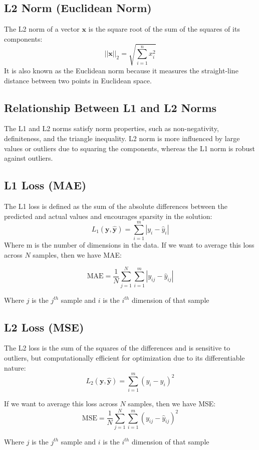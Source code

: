 \documentclass[12pt]{article}
\begin{document}
\subsection{L2 Norm (Euclidean Norm)}
The L2 norm of a vector \( \mathbf{x} \) is the square root of the sum of the squares of its components:
\[ ||\mathbf{x}||_2 = \sqrt{\sum_{i=1}^{n} x_i^2} \]
It is also known as the Euclidean norm because it measures the straight-line distance between two points in Euclidean space.

\subsection{Relationship Between L1 and L2 Norms}
The L1 and L2 norms satisfy norm properties, such as non-negativity, definiteness, and the triangle inequality. L2 norm is more influenced by large values or outliers due to squaring the components, whereas the L1 norm is robust against outliers.

\subsection{L1 Loss (MAE)}
The L1 loss is defined as the sum of the absolute differences between the predicted and actual values and encourages sparsity in the solution:
\[ L_1(\mathbf{y}, \mathbf{\hat{y}}) = \sum_{i=1}^{m} |y_i - \hat{y}_i| \]
Where m is the number of dimensions in the data. If we want to average this loss across \(N\) samples, then we have MAE:

\[ \text{MAE} = \frac{1}{N} \sum_{j=1}^{N}  \sum_{i=1}^{m} |y_{ij} - \hat{y}_{ij}| \]

Where \(j\) is the \(j^{th}\) sample and \(i\) is the \(i^{th}\) dimension of that sample

\subsection{L2 Loss (MSE)}
The L2 loss is the sum of the squares of the differences and is sensitive to outliers, but computationally efficient for optimization due to its differentiable nature:
\[ L_2(\mathbf{y}, \mathbf{\hat{y}}) = \sum_{i=1}^{m} (y_i - \hat{y}_i)^2 \]

If we want to average this loss across \(N\) samples, then we have MSE:
\[ \text{MSE} = \frac{1}{N} \sum_{j=1}^{N}   \sum_{i=1}^{m} (y_{ij}- \hat{y}_{ij})^2  \]

Where \(j\) is the \(j^{th}\) sample and \(i\) is the \(i^{th}\) dimension of that sample\\
\end{document}
